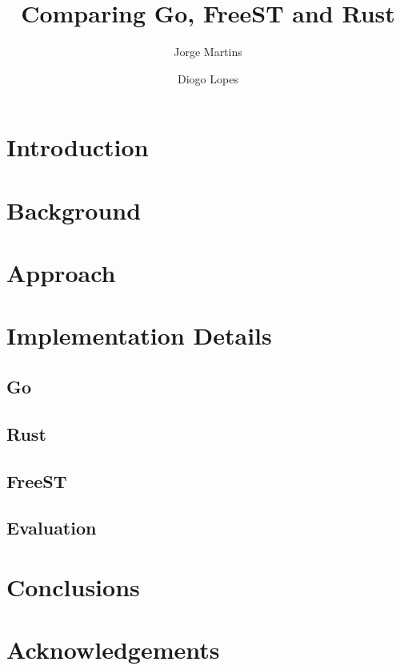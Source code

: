 \documentclass[runningheads]{llncs}
\begin{document}
\title{Comparing Go, FreeST and Rust}
\author{Jorge Martins \and
Diogo Lopes
}

\nocite{*}
\maketitle
\thispagestyle{empty}
\begin{abstract}
\lipsum[1]
\end{abstract}
\section{Introduction}
\lipsum
\section{Background}
\lipsum[1]
\section{Approach}
\lipsum[1]
\section{Implementation Details}
\lipsum[1]
\subsection{Go}
\lipsum[1]
\subsection{Rust}
\lipsum[1]
\subsection{FreeST}
\lipsum[1]
\subsection{Evaluation}
\lipsum[1]
\section{Conclusions}
\lipsum
\section*{Acknowledgements}
\lipsum[1]


\end{document}
